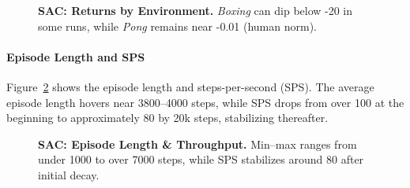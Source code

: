 \begin{figure}
	\centering
	\quad
	\caption{\textbf{SAC: Returns by Environment.} \emph{Boxing} can dip below -20 in some runs, while \emph{Pong} remains near -0.01 (human norm).}
	\label{fig:sac_returns_pergame}
\end{figure}

\paragraph{Episode Length and SPS}
Figure~\ref{fig:sac_epilen_sps} shows the episode length and steps-per-second (SPS). The average episode length hovers near 3800–4000 steps, while SPS drops from over 100 at the beginning to approximately 80 by 20k steps, stabilizing thereafter.

\begin{figure}
	\centering
	\quad
	\caption{\textbf{SAC: Episode Length \& Throughput.} Min–max ranges from under 1000 to over 7000 steps, while SPS stabilizes around 80 after initial decay.}
	\label{fig:sac_epilen_sps}
\end{figure}

